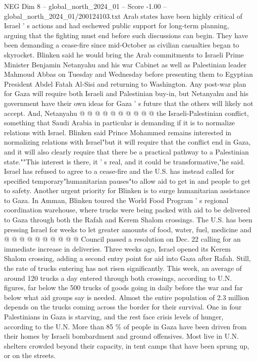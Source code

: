 \begin{textsample}{NEG Dim 8 – global\_north\_2024\_01 – Score -1.00 – global\_north\_2024\_01/200124103.txt}
Arab states have been highly critical of Israel ' s actions and had eschewed public support for long-term planning, arguing that the fighting must end before such discussions can begin.
They have been demanding a cease-fire since mid-October as civilian casualties began to skyrocket.
Blinken said he would bring the Arab commitments to Israeli Prime Minister Benjamin Netanyahu and his war Cabinet as well as Palestinian leader Mahmoud Abbas on Tuesday and Wednesday before presenting them to Egyptian President Abdel Fatah Al-Sisi and returning to Washington.
Any post-war plan for Gaza will require both Israeli and Palestinian buy-in, but Netanyahu and his government have their own ideas for Gaza ' s future that the others will likely not accept.
And, Netanyahu @ @ @ @ @ @ @ @ @ @ the Israeli-Palestinian conflict, something that Saudi Arabia in particular is demanding if it is to normalize relations with Israel.
Blinken said Prince Mohammed remains interested in normalizing relations with Israel"but it will require that the conflict end in Gaza, and it will also clearly require that there be a practical pathway to a Palestinian state.""This interest is there, it ' s real, and it could be transformative,"he said.
Israel has refused to agree to a cease-fire and the U.S. has instead called for specified temporary"humanitarian pauses"to allow aid to get in and people to get to safety.
Another urgent priority for Blinken is to surge humanitarian assistance to Gaza.
In Amman, Blinken toured the World Food Program ' s regional coordination warehouse, where trucks were being packed with aid to be delivered to Gaza through both the Rafah and Kerem Shalom crossings.
The U.S. has been pressing Israel for weeks to let greater amounts of food, water, fuel, medicine and @ @ @ @ @ @ @ @ @ @ Council passed a resolution on Dec. 22 calling for an immediate increase in deliveries.
Three weeks ago, Israel opened its Kerem Shalom crossing, adding a second entry point for aid into Gaza after Rafah.
Still, the rate of trucks entering has not risen significantly.
This week, an average of around 120 trucks a day entered through both crossings, according to U.N. figures, far below the 500 trucks of goods going in daily before the war and far below what aid groups say is needed.
Almost the entire population of 2.3 million depends on the trucks coming across the border for their survival.
One in four Palestinians in Gaza is starving, and the rest face crisis levels of hunger, according to the U.N.
More than 85 \% of people in Gaza have been driven from their homes by Israeli bombardment and ground offensives.
Most live in U.N. shelters crowded beyond their capacity, in tent camps that have been sprung up, or on the streets.

\end{textsample}
